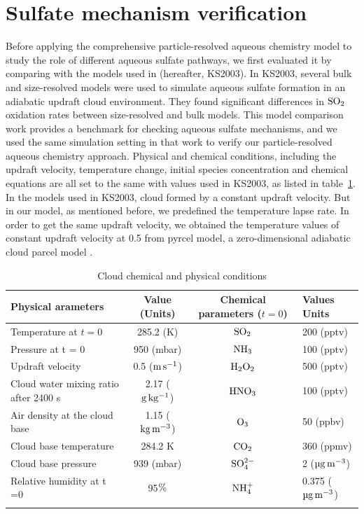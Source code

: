 \documentclass[edeposit,fullpage]{uiucthesis2009}
\begin{document}
\section{Sulfate mechanism verification}
Before applying the comprehensive particle-resolved aqueous chemistry model to study the role of different aqueous sulfate pathways, we first evaluated it by comparing with the models used in \cite{kreidenweis2003modification}(hereafter, KS2003). In KS2003, several bulk and size-resolved models were used to simulate aqueous sulfate formation in an adiabatic updraft cloud environment. They found significant differences in $\rm SO_2$ oxidation rates between size-resolved and bulk models. This model comparison work provides a benchmark for checking aqueous sulfate mechanisms, and we used the same simulation setting in that work to verify our particle-resolved aqueous chemistry approach. Physical and chemical conditions, including the updraft velocity, temperature change, initial species concentration and chemical equations are all set to the same with values used in KS2003, as listed in table~\ref{setting}. In the models used in KS2003, cloud formed by a constant updraft velocity. But in our model, as mentioned before, we predefined the temperature lapse rate. In order to get the same updraft velocity, we obtained the temperature values of constant updraft velocity at 0.5 from pyrcel model, a zero-dimensional adiabatic cloud parcel model \citep{rothenberg2016metamodeling}. 

\begin{table}[ht]
\centering
\begin{threeparttable}
\caption{Cloud  chemical and physical conditions}
 \begin{tabular}{l c|c l}
 \hline
  Physical arameters & Value (Units) & Chemical parameters ($t = 0$) & Values Units\\
 \hline
 Temperature at $t =0$ & 285.2 (K)&$\rm SO_2$ & 200 (pptv)\\
 Pressure at t = 0 & 950 (mbar)&$\rm NH_3$ & 100 (pptv)\\
 Updraft velocity & 0.5 ($\rm m\,s^{-1}$)&$\rm H_2O_2$ & 500 (pptv)\\
 Cloud water mixing ratio after 2400 s& 2.17 ($\rm g\,kg^{-1}$)&$\rm HNO_3$  & 100 (pptv)\\
 Air density at the cloud base & 1.15 ($\rm kg\,m^{-3}$) & $\rm O_3$ &50 (ppbv)\\
 Cloud base temperature& 284.2 K&$\rm CO_2$ & 360 (ppmv)\\
 Cloud base pressure& 939 (mbar)& $\rm SO_4^{2-}$ & 2 ($\rm \mu g \, m^{-3}$)\\ 
 Relative humidity at t =0 & 95$\rm \%$ & $\rm NH_4^+$ & 0.375 ($\rm \mu g\, m^{-3}$)\\
 \hline
 \label{setting}
\end{tabular}
\end{threeparttable}
\end{table}
\end{document}

